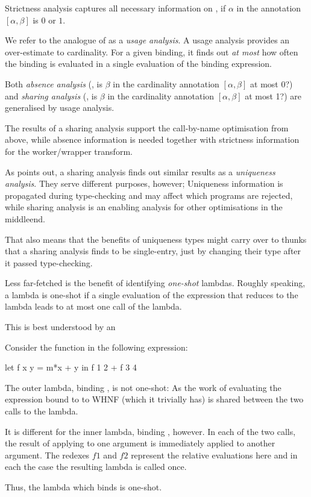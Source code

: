 Strictness analysis captures all necessary information on \MinCard, \eg if $\alpha$ in the annotation $[\alpha,\beta]$ is $0$ or $1$.

We refer to the analogue of \MaxCard as a \emph{usage analysis}.
A usage analysis provides an over-estimate to cardinality.
For a given binding, it finds out \emph{at most} how often the binding is evaluated in a single evaluation of the binding expression.

Both \emph{absence analysis} (\eg, is $\beta$ in the cardinality annotation $[\alpha, \beta]$ at most 0?) and \emph{sharing analysis} (\eg, is $\beta$ in the cardinality annotation $[\alpha, \beta]$ at most 1?) are generalised by usage analysis.

The results of a sharing analysis support the call-by-name optimisation from above, while absence information is needed together with strictness information for the worker/wrapper transform.

As \textcite[section~2.4]{verstoep} points out, a sharing analysis finds out similar results as a \emph{uniqueness analysis}.
They serve different purposes, however; Uniqueness information is propagated during type-checking and may affect which programs are rejected, while sharing analysis is an enabling analysis for other optimisations in the middleend.

That also means that the benefits of uniqueness types might carry over to thunks that a sharing analysis finds to be single-entry, just by changing their type after it passed type-checking.

Less far-fetched is the benefit of identifying \emph{one-shot} lambdas.
Roughly speaking, a lambda is one-shot if a single evaluation of the expression that reduces to the lambda leads to at most one call of the lambda.

This is best understood by an

\begin{example}
  Consider the function  in the following expression:
  \begin{haskellcode}
    let f x y = m*x + y
    in f 1 2 + f 3 4
  \end{haskellcode}

  The outer lambda, binding , is not one-shot:
  As the work of evaluating the expression bound to  to WHNF (which it trivially has) is shared between the two calls to the lambda.

  It is different for the inner lambda, binding , however.
  In each of the two calls, the result of applying  to one argument is immediately applied to another argument. The redexes $f 1$ and $f 2$ represent the relative evaluations here and in each the case the resulting lambda is called once.
  
  Thus, the lambda which binds  is one-shot.
\end{example}


